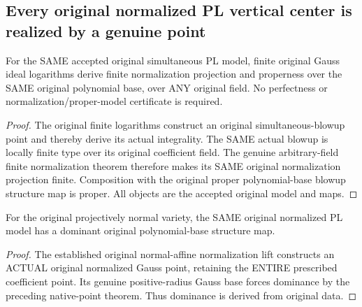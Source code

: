 \subsection{Every original normalized PL vertical center is realized by a genuine point}

\begin{theorem}
\label{local:original-normalized-pl-model-proper-any-field}
\leanok
{}
For the SAME accepted original simultaneous PL model, finite original Gauss
ideal logarithms derive finite normalization projection and properness over
the SAME original polynomial base, over ANY original field. No perfectness or
normalization/proper-model certificate is required.
\end{theorem}
\begin{proof}
The original finite logarithms construct an original simultaneous-blowup point
and thereby derive its actual integrality. The SAME actual blowup is locally
finite type over its original coefficient field. The genuine arbitrary-field
finite normalization theorem therefore makes its SAME original normalization
projection finite. Composition with the original proper polynomial-base blowup
structure map is proper. All objects are the accepted original model and maps.
\end{proof}

\begin{theorem}
\label{local:original-normalized-pl-model-dominant}
\leanok
{}
For the original projectively normal variety, the SAME original normalized PL
model has a dominant original polynomial-base structure map.
\end{theorem}
\begin{proof}
The established original normal-affine normalization lift constructs an ACTUAL
original normalized Gauss point, retaining the ENTIRE prescribed coefficient
point. Its genuine positive-radius Gauss base forces dominance by the preceding
native-point theorem. Thus dominance is derived from original data.
\end{proof}

